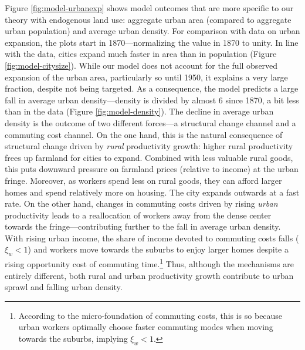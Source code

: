 \documentclass[./20250130-paper.tex]{subfiles}
\begin{document}
 Figure \ref{fig:model-urbanexp} shows model outcomes that are more specific to our theory with endogenous land use: aggregate urban area (compared to aggregate urban population) and average urban density. For comparison with data on urban expansion, the plots start in 1870---normalizing the value in 1870 to unity. In line with the data, cities expand much faster in area than in population (Figure \ref{fig:model-citysize}). While our model does not account for the full observed expansion of the urban area, particularly so until 1950, it explains a very large fraction, despite not being targeted. As a consequence, the model predicts a large fall in average urban density---density is divided by almost 6 since 1870, a bit less than in the data (Figure \ref{fig:model-density}). The decline in average urban density is the outcome of two different forces---a structural change channel and a commuting cost channel. On the one hand, this is the natural consequence of structural change driven by \textit{rural} productivity growth: higher rural productivity frees up farmland for cities to expand. Combined with less valuable rural goods, this puts downward pressure on farmland prices (relative to income) at the urban fringe. Moreover, as workers spend less on rural goods, they can afford larger homes and spend relatively more on housing. The city expands outwards at a fast rate. On the other hand, changes in commuting costs driven by rising \textit{urban} productivity leads to a reallocation of workers away from the dense center towards the fringe---contributing further to the fall in average urban density. With rising urban income, the share of income devoted to commuting costs falls ($\xi_w<1$) and workers move towards the suburbs to enjoy larger homes despite a rising opportunity cost of commuting time.\footnote{According to the micro-foundation of commuting costs, this is so because urban workers optimally choose faster commuting modes when moving towards the suburbs, implying $\xi_w<1$.} Thus, although the mechanisms are entirely different, both rural and urban productivity growth contribute to urban sprawl and falling urban density.



		
\end{document}

